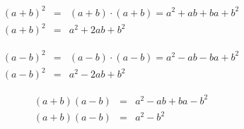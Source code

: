 \begin{regel}
 \begin{eqnarray*}
  (a+b)^2 &=& (a+b)\cdot (a+b) = a^2 +ab+ba+b^2\\
  (a+b)^2 &=& a^2+ 2ab +b^2
 \end{eqnarray*}

\end{regel}

\begin{regel}
  \begin{eqnarray*}
  (a-b)^2 &=& (a-b)\cdot (a-b) = a^2 -ab -ba +b^2\\
  (a-b)^2 &=& a^2- 2ab +b^2
 \end{eqnarray*}
\end{regel}

\begin{regel}
   \begin{eqnarray*}
  (a+b)(a-b) &=& a^2 -ab +ba -b^2\\
  (a+b)(a-b) &=& a^2-b^2
 \end{eqnarray*}
\end{regel}

